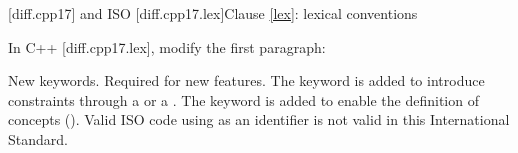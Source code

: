 \setcounter{chapter}{2}


\setcounter{section}{4}
[diff.cpp17]{\Cpp{} and ISO \CppXVII{}}
[diff.cpp17.lex]{Clause \ref{lex}: lexical conventions}

In C++ [diff.cpp17.lex], modify the first paragraph:

\begin{std.txt}
\change New keywords.
\rationale Required for new features.
The  keyword is added
to introduce constraints through a  or
a . The  keyword is
added to enable the definition of concepts ().
\effect
Valid ISO \CppXVII{} code using \added{,} 
as an identifier is not valid in this International Standard.
\end{std.txt}
